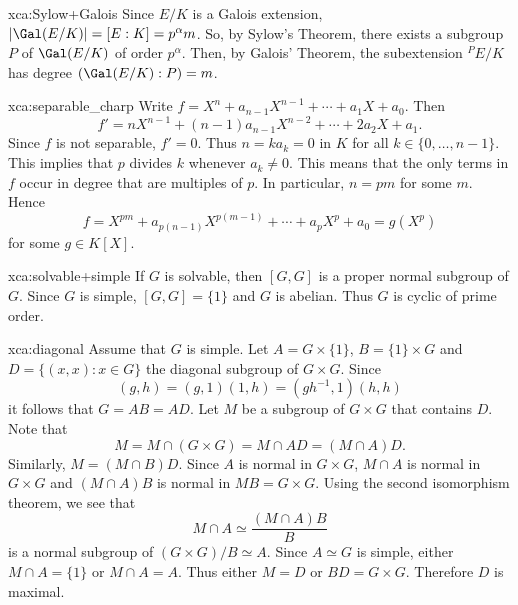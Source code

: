  \begin{sol}{xca:Sylow+Galois}
     Since $E/K$ is a Galois extension,
     $|\Gal(E/K)|=[E:K]=p^\alpha m$.
     So, by Sylow's Theorem, there exists a subgroup $P$ 
     of $\Gal(E/K)$
     of order $p^{\alpha}$.
     Then, by Galois' Theorem, the subextension
     ${}^PE/K$
     has degree $(\Gal(E/K):P)=m$.
 \end{sol}

\begin{sol}{xca:separable_charp}
    Write $f=X^n+a_{n-1}X^{n-1}+\cdots+a_1X+a_0$. Then 
    \[ 
    f'=nX^{n-1}+(n-1)a_{n-1}X^{n-2}+\cdots+2a_2X+a_1.
    \]
    Since $f$ is not separable, $f'=0$. Thus $n=ka_k=0$ in $K$ for all $k\in\{0,\dots,n-1\}$. This implies
    that $p$ divides $k$ whenever $a_k\ne 0$. This means that the only terms in $f$ occur in degree 
    that are multiples of $p$. In particular, $n=pm$ for some $m$. Hence 
    \[
    f=X^{pm}+a_{p(n-1)}X^{p(m-1)}+\cdots+a_pX^p+a_0=g(X^p)
    \]
    for some $g\in K[X]$.  
\end{sol}


\begin{sol}{xca:solvable+simple}
 If $G$ is solvable, then $[G,G]$ is a proper normal subgroup of $G$. 
 Since $G$ is simple, $[G,G]=\{1\}$ and $G$ is abelian. Thus $G$ is cyclic of prime order.
\end{sol}

\begin{sol}{xca:diagonal}
 Assume that $G$ is simple. Let $A=G\times\{1\}$, $B=\{1\}\times G$ and
 $D=\{(x,x):x\in G\}$ the diagonal subgroup of $G\times G$. 
 Since 
 \[
 (g,h)=(g,1)(1,h)=(gh^{-1},1)(h,h)
 \]
 it follows that $G=AB=AD$. Let $M$ be a subgroup of $G\times G$ that contains $D$. 
 Note that
 \[
 M=M\cap (G\times G)=M\cap AD=(M\cap A)D. 
 \]
 Similarly, $M=(M\cap B)D$. Since $A$ is normal in $G\times G$, $M\cap A$ is normal in $G\times G$ 
 and $(M\cap A)B$ is normal in $MB=G\times G$. Using the second isomorphism theorem, we see that
 \[
 M\cap A\simeq \frac{(M\cap A)B}{B}
 \]
 is a normal subgroup of $(G\times G)/B\simeq A$. Since $A\simeq G$ is simple, either 
 $M\cap A=\{1\}$ or $M\cap A=A$. Thus either $M=D$ or $BD=G\times G$. Therefore $D$ is maximal.
 \end{sol}
